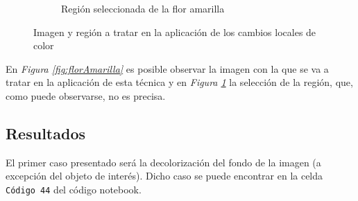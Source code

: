 \documentclass[11pt,twoside,titlepage,a4paper]{article}
\numberwithin{equation}{section} %
\theoremstyle{usual}
\begin{document}
\begin{figure}[h]
\begin{subfigure}[t]{.45\textwidth}
        \caption{Región seleccionada de la flor amarilla}
        \label{fig:regionFlorAmarilla}%
    \end{subfigure}
    \caption{Imagen y región a tratar en la aplicación de los cambios locales de color}
    \label{fig:ejemploCambiosColoLocales}
\end{figure}

En \textit{Figura \ref{fig:florAmarilla}} es posible observar la imagen con la que se va a tratar en la aplicación de esta técnica y en \textit{Figura \ref{fig:regionFlorAmarilla}} la selección de la región, que, como puede observarse, no es precisa.

\subsection{Resultados}

El primer caso presentado será la decolorización del fondo de la imagen (a excepción del objeto de interés). Dicho caso se puede encontrar en la celda \texttt{Código 44} del código notebook.
\end{document}

